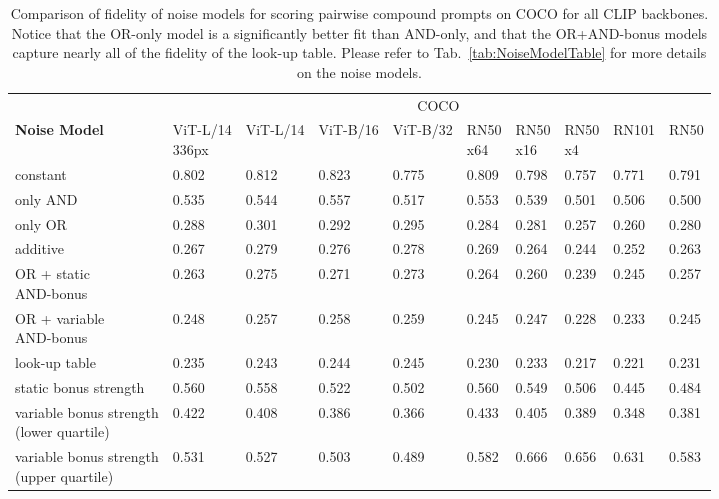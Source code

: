 \begin{table*}[ht]
\centering
\begin{tabular}{l|lllllllll}
\toprule
{} & \multicolumn{9}{c}{COCO} \\
\textbf{Noise Model} & \makecell{ViT-L/14 \\ 336px} & ViT-L/14 & ViT-B/16 & ViT-B/32 & \makecell{RN50 \\ x64} & \makecell{RN50 \\ x16} & \makecell{RN50 \\ x4} &  RN101 &   RN50 \\
\midrule
constant                   &        0.802 &   0.812 &   0.823 &   0.775 &   0.809 &   0.798 &  0.757 &  0.771 &  0.791 \\
\hline
only AND                     &        0.535 &   0.544 &   0.557 &   0.517 &   0.553 &   0.539 &  0.501 &  0.506 &  0.500 \\
\hline
only OR                      &        0.288 &   0.301 &   0.292 &   0.295 &   0.284 &   0.281 &  0.257 &  0.260 &  0.280 \\
\hline
additive                     &        0.267 &   0.279 &   0.276 &   0.278 &   0.269 &   0.264 &  0.244 &  0.252 &  0.263 \\
\hline
\makecell{OR + static \\ AND-bonus}            &        0.263 &   0.275 &   0.271 &   0.273 &   0.264 &   0.260 &  0.239 &  0.245 &  0.257 \\
\hline
\makecell{OR + variable \\ AND-bonus}  &        0.248 &   0.257 &   0.258 &   0.259 &   0.245 &   0.247 &  0.228 &  0.233 &  0.245 \\
\hline
look-up table                 &        0.235 &   0.243 &   0.244 &   0.245 &   0.230 &   0.233 &  0.217 &  0.221 &  0.231 \\
\hline \hline
static bonus strength                        &        0.560 &   0.558 &   0.522 &   0.502 &   0.560 &   0.549 &  0.506 &  0.445 &  0.484 \\
\hline
\makecell{variable bonus strength \\ (lower quartile)}   &        0.422 &   0.408 &   0.386 &   0.366 &   0.433 &   0.405 &  0.389 &  0.348 &  0.381 \\
\hline
\makecell{variable bonus strength \\ (upper quartile)}    &        0.531 &   0.527 &   0.503 &   0.489 &   0.582 &   0.666 &  0.656 &  0.631 &  0.583 \\
\bottomrule
\end{tabular}
\caption{Comparison of fidelity of noise models for scoring pairwise compound prompts on COCO for all CLIP backbones. Notice that the OR-only model is a significantly better fit than AND-only, and that the OR+AND-bonus models capture nearly all of the fidelity of the look-up table. Please refer to Tab.~\ref{tab:NoiseModelTable} for more details on the noise models.}
\label{tab:NoiseModelExtendedCOCO}
\end{table*}

